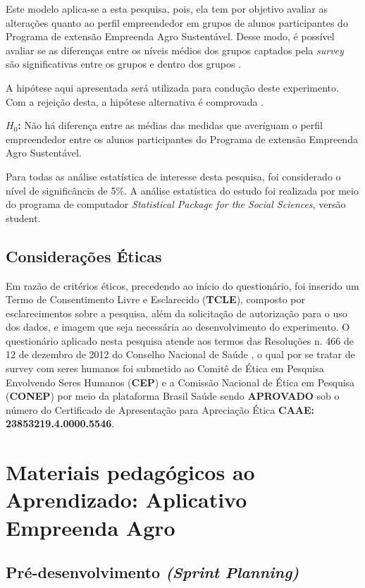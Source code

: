 Este modelo aplica-se a esta pesquisa, pois, ela tem por objetivo avaliar as alterações quanto ao perfil empreendedor em grupos de alunos participantes do Programa de extensão Empreenda Agro Sustentável. Desse modo, é possível avaliar se as diferenças entre os níveis médios dos grupos captados pela \textit{survey} são significativas entre os grupos e dentro dos grupos \cite{rocha_avaliacao_2014}.

A hipótese aqui apresentada será utilizada para condução deste experimento. Com a rejeição desta, a hipótese alternativa é comprovada \cite{hair_alise_2009}.

\textbf{$H_0$:} Não há diferença entre as médias das medidas que averíguam o perfil empreendedor entre os alunos participantes do Programa de extensão Empreenda Agro Sustentável.

Para todas as análise estatística de interesse desta pesquisa, foi considerado o nível de significância de 5\%. A análise estatística do estudo foi realizada por meio do programa de computador \textit{Statistical Package for the Social Sciences}, \cite{ibm_corp_ibm_2017} versão student. 

\subsection{Considerações Éticas}

Em razão de critérios éticos, precedendo ao início do questionário, foi inserido um Termo de Consentimento Livre e Esclarecido (\textbf{TCLE}), composto por esclarecimentos sobre a pesquisa, além da solicitação de autorização para o uso dos dados, e imagem que seja necessária ao desenvolvimento do experimento. O questionário aplicado nesta pesquisa atende aos termos das Resoluções n. 466 de 12 de dezembro de 2012 do Conselho Nacional de Saúde \cite{cns_resolucao_2012}, o qual por se tratar de survey com seres humanos foi submetido ao Comitê de Ética em Pesquisa Envolvendo Seres Humanos (\textbf{CEP}) e a Comissão Nacional de Ética em Pesquisa (\textbf{CONEP}) por meio da plataforma Brasil Saúde sendo \textbf{APROVADO} sob o número do Certificado de Apresentação para Apreciação Ética \textbf{CAAE: 23853219.4.0000.5546}.

\section{Materiais pedagógicos ao Aprendizado: Aplicativo Empreenda Agro}

\subsection{Pré-desenvolvimento \textit{(Sprint Planning)}}

